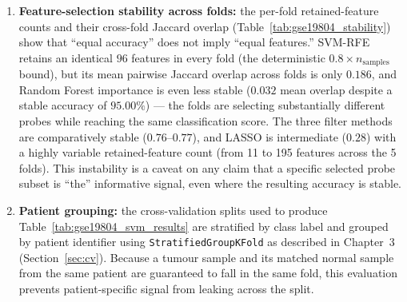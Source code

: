 \begin{enumerate}
    \item \textbf{Feature-selection stability across folds:} the per-fold retained-feature counts and their cross-fold Jaccard overlap (Table~\ref{tab:gse19804_stability}) show that ``equal accuracy'' does not imply ``equal features.'' SVM-RFE retains an identical $96$ features in every fold (the deterministic $0.8 \times n_{\mathrm{samples}}$ bound), but its mean pairwise Jaccard overlap across folds is only $0.186$, and Random Forest importance is even less stable ($0.032$ mean overlap despite a stable accuracy of $95.00\%$) --- the folds are selecting substantially different probes while reaching the same classification score. The three filter methods are comparatively stable ($0.76$--$0.77$), and LASSO is intermediate ($0.28$) with a highly variable retained-feature count (from 11 to 195 features across the 5 folds). This instability is a caveat on any claim that a specific selected probe subset is ``the'' informative signal, even where the resulting accuracy is stable.
    \item \textbf{Patient grouping:} the cross-validation splits used to produce Table~\ref{tab:gse19804_svm_results} are stratified by class label and grouped by patient identifier using \texttt{StratifiedGroupKFold} as described in Chapter~3 (Section~\ref{sec:cv}). Because a tumour sample and its matched normal sample from the same patient are guaranteed to fall in the same fold, this evaluation prevents patient-specific signal from leaking across the split.
\end{enumerate}

